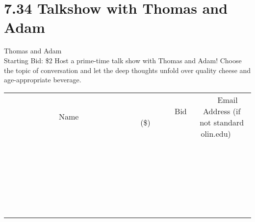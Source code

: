 \documentclass[11pt]{article}
\begin{document}
\section*{7.34 Talkshow with Thomas and Adam}
Thomas and Adam
\\
Starting Bid: \$2
\newline
Host a prime-time talk show with Thomas and Adam! Choose the topic of conversation and let the deep thoughts unfold over quality cheese and age-appropriate beverage.
\\[6ex]
\begin{tabular}{c c c}
~~~~~~~~~~~~~Name~~~~~~~~~~~~~ & ~~~~~~~~~Bid (\$)~~~~~~~~~  & ~~~Email Address (if not standard olin.edu)~~~\\
 & & \\
\hline
 & & \\
\hline
 & & \\
\hline
 & & \\
\hline
 & & \\
\hline
 & & \\
\hline
 & & \\
\hline
 & & \\
\hline
 & & \\
\hline
 & & \\
\hline
 & & \\
\hline
 & & \\
\hline
 & & \\
\hline
 & & \\
\hline
 & & \\
\hline
 & & \\
\hline
 & & \\
\hline
 & & \\
\hline
 & & \\
\hline
 & & \\
\hline
 & & \\
\hline
 & & \\
\hline
 & & \\
\hline
 & & \\
\hline
 & & \\
\hline
 & & \\
\hline
\end{tabular}
\newpage
\end{document}
